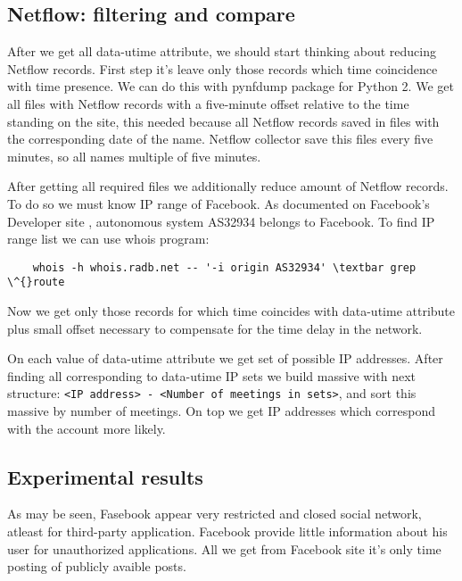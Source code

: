  \subsection{Netflow: filtering and compare}
 After we get all data-utime attribute, we should start thinking about reducing Netflow records. First step it's leave only those records which time coincidence with time presence. We can do this with pynfdump package for Python 2. We get all files with Netflow records with a five-minute offset relative to the time standing on the site, this needed because all Netflow records saved in files with the corresponding date of the name. Netflow collector save this files every five minutes, so all names multiple of five minutes. \par After getting all required files we additionally reduce amount of Netflow records. To do so we must know IP range of Facebook. As documented on Facebook's Developer site \cite{fbDevelop}, autonomous system AS32934 belongs to Facebook. To find IP range list we can use whois program:
 \begin{lstlisting}
    whois -h whois.radb.net -- '-i origin AS32934' \textbar grep \^{}route
\end{lstlisting}
Now we get only those records for which time coincides with data-utime attribute plus small offset necessary to compensate for the time delay in the network. \par On each value of data-utime attribute we get set of possible IP addresses. After finding all corresponding to data-utime IP sets we build massive with next structure: 
\texttt{<IP address> - <Number of meetings in sets>}, and sort this massive by number of meetings. On top we get IP addresses which correspond with the account more likely.
\subsection{Experimental results}
As may be seen, Fasebook appear very restricted and closed social network, atleast for third-party application. Facebook provide little information about his user for unauthorized applications. All we get from Facebook site it's only time posting of publicly avaible posts.
